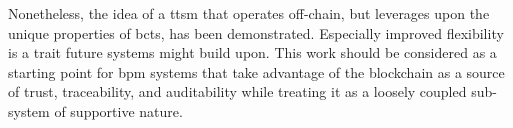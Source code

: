 Nonetheless, the idea of a \gls{ttsm} that operates off-chain, but leverages upon the unique properties of \glspl{bct}, has been demonstrated. Especially improved flexibility is a trait future systems might build upon. This work should be considered as a starting point for \gls{bpm} systems that take advantage of the blockchain as a source of trust, traceability, and auditability while treating it as a loosely coupled sub-system of supportive nature.





